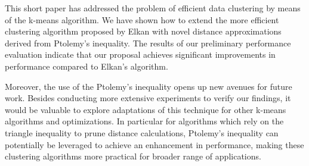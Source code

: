 
This short paper has addressed the problem of efficient data clustering by means of the k-means algorithm.
We have shown how to extend the more efficient clustering algorithm proposed by Elkan with novel distance approximations derived from Ptolemy's inequality.
The results of our preliminary performance evaluation indicate that our proposal achieves significant improvements in performance compared to Elkan's algorithm. %

Moreover, the use of the Ptolemy's inequality opens up new avenues for future work.
Besides conducting more extensive experiments to verify our findings,
it would be valuable to explore adaptations of this technique for other k-means algorithms and optimizations.
In particular for algorithms which rely on the triangle inequality to prune distance calculations, Ptolemy's inequality can potentially be leveraged to achieve an enhancement in performance, making these clustering algorithms more practical for broader range of applications.




